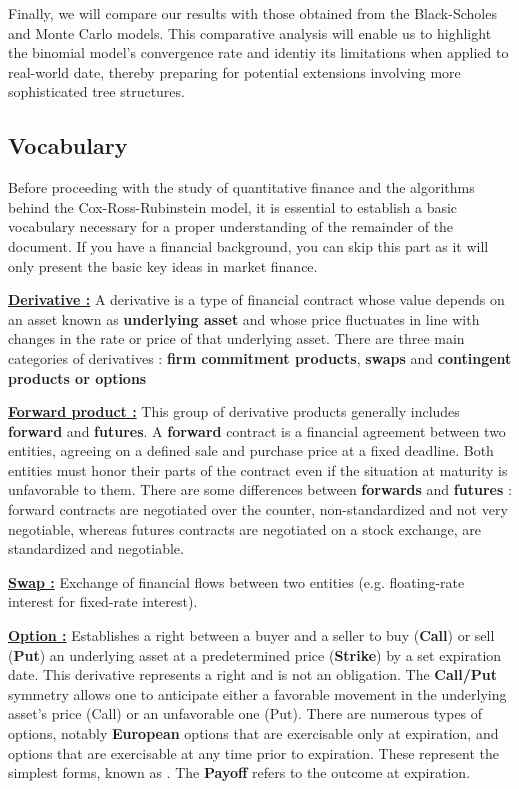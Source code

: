 Finally, we will compare our results with those obtained from the Black-Scholes and Monte Carlo models. 
This comparative analysis will enable us to highlight the binomial model's convergence rate and identiy its limitations when applied to real-world date, thereby preparing for potential extensions involving more sophisticated tree structures.

\subsection{Vocabulary}

Before proceeding with the study of quantitative finance and the algorithms behind the Cox-Ross-Rubinstein model, it is essential to establish a basic vocabulary necessary for a proper understanding of the remainder of the document. 
If you have a financial background, you can skip this part as it will only present the basic key ideas in market finance.


\underline{\textbf{Derivative :}} A derivative is a type of financial contract whose value depends on an asset known as \textbf{underlying asset} and whose price fluctuates in line with changes in the rate or price of that underlying asset.
There are three main categories of derivatives : \textbf{firm commitment products}, \textbf{swaps} and \textbf{contingent products or options} \cite{Derivatives} \cite{ProduitsDerives} \cite{ProduitDerive} 

\underline{\textbf{Forward product :}} This group of derivative products generally includes \textbf{forward} and \textbf{futures}. 
A \textbf{forward} contract is a financial agreement between two entities, agreeing on a defined sale and purchase price at a fixed deadline.
Both entities must honor their parts of the contract even if the situation at maturity is unfavorable to them.
There are some differences between \textbf{forwards} and \textbf{futures} : forward contracts are negotiated over the counter, non-standardized and not very negotiable, whereas futures contracts are negotiated on a stock exchange, are standardized and negotiable. \cite{Derivatives} \cite{ProduitsDerives} \cite{Forward} \cite{Swap} 

\underline{\textbf{Swap :}} Exchange of financial flows between two entities (e.g. floating-rate interest for fixed-rate interest). \cite{Swap}

\underline{\textbf{Option :}} Establishes a right between a buyer and a seller to buy (\textbf{Call}) or sell (\textbf{Put}) an underlying asset at a predetermined price (\textbf{Strike}) by a set expiration date.
This derivative represents a right and is not an obligation.
The \textbf{Call/Put} symmetry allows one to anticipate either a favorable movement in the underlying asset's price (Call) or an unfavorable one (Put).
There are numerous types of options, notably \textbf{European} options that are exercisable only at expiration, and  options that are exercisable at any time prior to expiration.
These represent the simplest forms, known as . \cite{VanillaOptions} \cite{Option}
The \textbf{Payoff} refers to the outcome at expiration.

